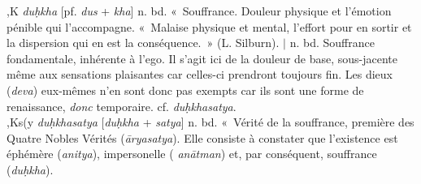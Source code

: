 \documentclass[a4paper,11pt,twocolumn]{article}
\begin{document}
{\dn {},K} {\em du\d{h}kha} [pf. {\em dus} + {\em kha}]
n. bd. «~Souffrance\fg. Douleur physique et l'émotion pénible qui
l'accompagne. «~Malaise physique et mental, l'effort pour en sortir
et la dispersion qui en est la conséquence.~» (L. Silburn). $\mid$
n. bd. Souffrance fondamentale, inhérente à l'ego. Il
s'agit ici de la douleur de base, sous-jacente même aux sensations
plaisantes car celles-ci prendront toujours fin. Les dieux ({\em deva})
eux-mêmes n'en sont donc pas exempts car ils sont une forme de
renaissance, {\em donc} temporaire. cf. {\em du\d{h}khasatya}. \\

{\dn {},Ks(y} {\em du\d{h}khasatya} [{\em du\d{h}kha} + {\em
satya}] n. bd. «~Vérité de la souffrance\fg, première des Quatre Nobles
Vérités ({\em \={a}ryasatya}). Elle consiste à constater que
l'existence est éphémère ({\em anitya}), impersonelle ({\em
an\={a}tman}) et, par conséquent, souffrance ({\em du\d{h}kha}). \\
\end{document}
